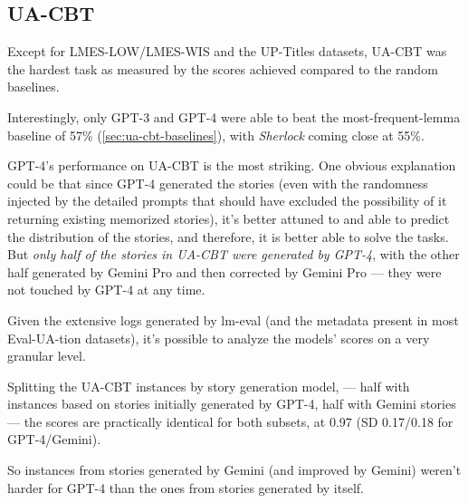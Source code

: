 

\subsection{UA-CBT}
\label{sec:ua-cbt-eval-analysis}
Except for LMES-LOW/LMES-WIS and the UP-Titles datasets, UA-CBT was the hardest task as measured by the scores achieved compared to the random baselines. 

Interestingly, only GPT-3 and GPT-4 were able to beat the most-frequent-lemma baseline of 57\% (\autoref{sec:ua-cbt-baselines}), with \textit{Sherlock} coming close at 55\%. 

GPT-4's performance on UA-CBT is the most striking. One obvious explanation could be that since GPT-4 generated the stories (even with the randomness injected by the detailed prompts that should have excluded the possibility of it returning existing memorized stories),
it's better attuned to and able to predict the distribution of the stories, and therefore, it is better able to solve the tasks. 
But \textit{only half of the stories in UA-CBT were generated by GPT-4}, with the other half generated by Gemini Pro and then corrected by Gemini Pro — they were not touched by GPT-4 at any time. 

Given the extensive logs generated by lm-eval (and the metadata present in most Eval-UA-tion datasets), it's possible to analyze the models' scores on a very granular level.

Splitting the UA-CBT instances by story generation model,
— half with instances based on stories initially generated by GPT-4, half with Gemini stories — 
the scores are practically identical for both subsets, at 0.97 (SD 0.17/0.18 for GPT-4/Gemini). 

So instances from stories generated by Gemini (and improved by Gemini) weren't harder for GPT-4 than the ones from stories generated by itself. 

